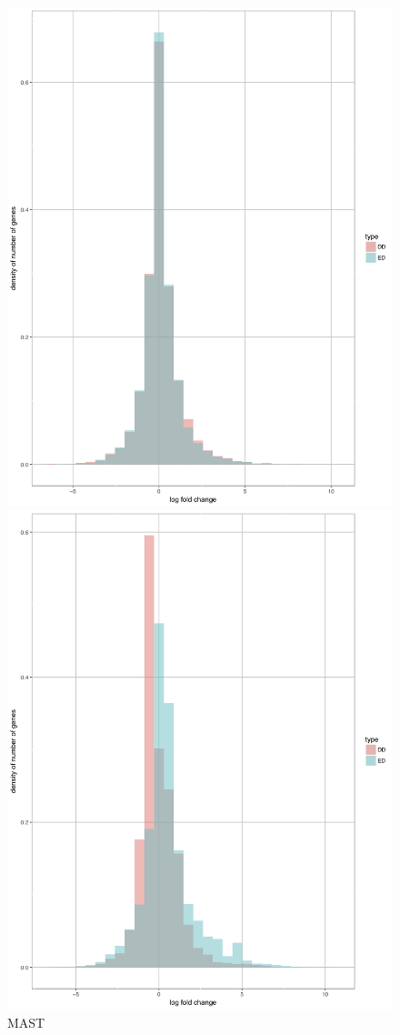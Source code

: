 \documentclass[11pt]{amsart}
\begin{document}
\begin{figure}[H]
  \includegraphics[width=\linewidth]{DEC_NPC_mast.png}
  \caption{MAST}
\endminipage\hfill
{}
  \includegraphics[width=\linewidth]{DEC_NPC_scdd.png}

\end{figure}
\end{document}
